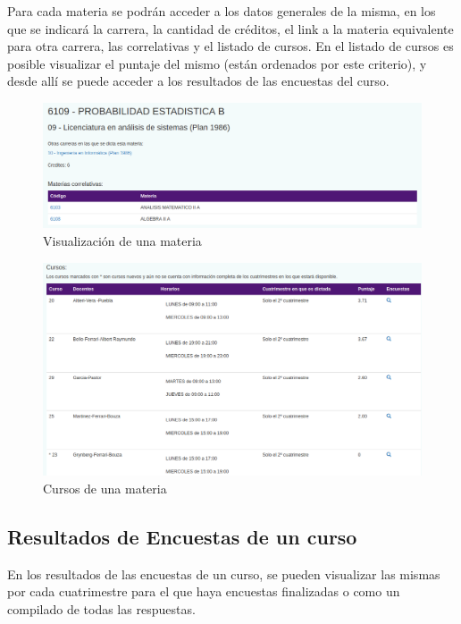 \documentclass[a4paper]{article}
\begin{document}
Para cada materia se podrán acceder a los datos generales de la misma, en los que se indicará la carrera, la cantidad de créditos, el link a la materia equivalente para otra carrera, las correlativas y el listado de cursos.
En el listado de cursos es posible visualizar el puntaje del mismo (están ordenados por este criterio), y desde allí se puede acceder a los resultados de las encuestas del curso.

\begin{figure}[H]
\centering
\includegraphics[scale=0.35]{Imagenes/ver_materia_datos_generales.png}\par
\caption{Visualización de una materia}
\end{figure}

\begin{figure}[H]
\centering
\includegraphics[scale=0.35]{Imagenes/ver_materia_cursos.png}\par
\caption{Cursos de una materia}
\end{figure}

\subsection{Resultados de Encuestas de un curso}

En los resultados de las encuestas de un curso, se pueden visualizar las mismas por cada cuatrimestre para el que haya encuestas finalizadas o como un compilado de todas las respuestas.
\end{document}
